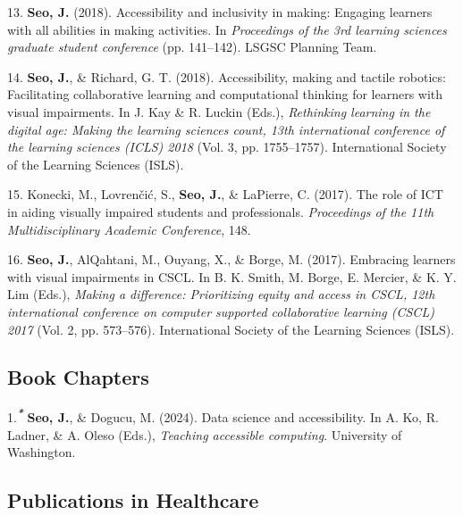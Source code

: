 \documentclass[11pt,a4paper,]{awesome-cv}
\newlength{\cslhangindent}
\newenvironment{CSLReferences}[2] %
 {\begin{list}{}{%
  \setlength{\itemindent}{0pt}
  \setlength{\leftmargin}{0pt}
  \setlength{\parsep}{0pt}
  \ifodd #1
   \setlength{\leftmargin}{\cslhangindent}
   \setlength{\itemindent}{-1\cslhangindent}
  \fi
  \setlength{\itemsep}{#2\baselineskip}}}
 {\end{list}}
\begin{document}
\begin{CSLReferences}{1}{0}
13. \textbf{Seo, J.} (2018). Accessibility and inclusivity in making:
Engaging learners with all abilities in making activities. In
\emph{Proceedings of the 3rd learning sciences graduate student
conference} (pp. 141--142). LSGSC Planning Team.

14. \textbf{Seo, J.}, \& Richard, G. T. (2018). Accessibility, making
and tactile robotics: Facilitating collaborative learning and
computational thinking for learners with visual impairments. In J. Kay
\& R. Luckin (Eds.), \emph{Rethinking learning in the digital age:
Making the learning sciences count, 13th international conference of the
learning sciences (ICLS) 2018} (Vol. 3, pp. 1755--1757). International
Society of the Learning Sciences (ISLS).

15. Konecki, M., Lovrenčić, S., \textbf{Seo, J.}, \& LaPierre, C.
(2017). The role of ICT in aiding visually impaired students and
professionals. \emph{Proceedings of the 11th Multidisciplinary Academic
Conference}, 148.

16. \textbf{Seo, J.}, AlQahtani, M., Ouyang, X., \& Borge, M. (2017).
Embracing learners with visual impairments in CSCL. In B. K. Smith, M.
Borge, E. Mercier, \& K. Y. Lim (Eds.), \emph{Making a difference:
Prioritizing equity and access in CSCL, 12th international conference on
computer supported collaborative learning (CSCL) 2017} (Vol. 2, pp.
573--576). International Society of the Learning Sciences (ISLS).

\end{CSLReferences}

\subsection{Book Chapters}\label{book-chapters}

\label{refs-20571be9e60cca0b4f6994e8763d6b1d}
\begin{CSLReferences}{1}{0}
1.\textsuperscript{\textbf{\emph{*}}} \textbf{Seo, J.}, \& Dogucu, M.
(2024). Data science and accessibility. In A. Ko, R. Ladner, \& A. Oleso
(Eds.), \emph{Teaching accessible computing}. University of Washington.

\end{CSLReferences}

\subsection{Publications in
Healthcare}\label{publications-in-healthcare}
\end{document}
